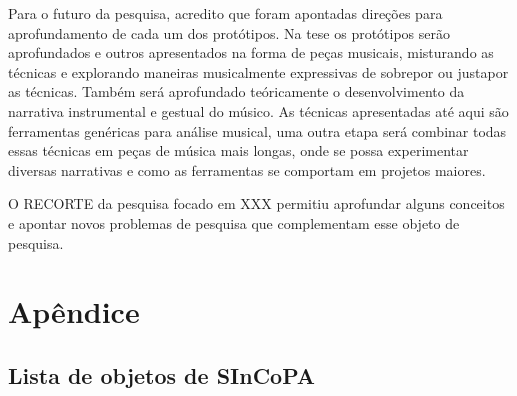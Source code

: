 \documentclass{ppgmus}
\begin{document}
Para o futuro da pesquisa, acredito que foram apontadas direções para aprofundamento
de cada um dos protótipos. Na tese os  protótipos serão aprofundados e 
outros apresentados na forma de peças musicais, misturando as técnicas e explorando 
maneiras musicalmente expressivas de
sobrepor ou justapor as técnicas. Também será aprofundado teóricamente o 
desenvolvimento da narrativa instrumental e gestual do músico. 
As técnicas apresentadas até aqui são ferramentas genéricas para análise musical,
uma outra etapa será combinar todas essas técnicas em peças de música mais longas,
onde se possa experimentar diversas narrativas e como as ferramentas se comportam
em projetos maiores.

O RECORTE da pesquisa  focado em XXX permitiu aprofundar alguns conceitos e apontar
novos problemas de pesquisa que complementam esse objeto de pesquisa.


 


\chapter{Apêndice}
\label{chap:anexos}

\section{Lista de objetos de SInCoPA}
\label{lista-sincopa}

\end{document}
